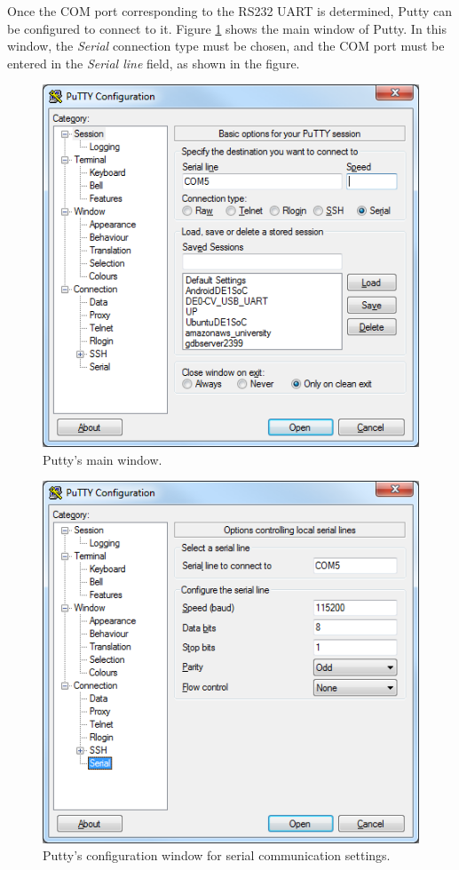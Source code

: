 \documentclass[11pt, twoside, pdftex]{article}
\begin{document}
Once the COM port corresponding to the RS232 UART is determined, Putty can be configured to connect to it. Figure \ref{fig:putty_1} shows the main window of Putty. In this window, the \textit{Serial} connection type must be chosen, and the COM port must be entered in the  \textit{Serial line} field, as shown in the figure. 

\begin{figure}[h!]
   \begin{center}
       \includegraphics[scale=0.7]{figures/fig_putty_tut_1}
   \end{center}
   \caption{Putty's main window.}
	\label{fig:putty_1}
\end{figure}

\begin{figure}[h!]
   \begin{center}
       \includegraphics[scale=0.8]{figures/fig_putty_tut_2}
   \end{center}
   \caption{Putty's configuration window for serial communication settings.}
	\label{fig:putty_2}
\end{figure}
\end{document}
